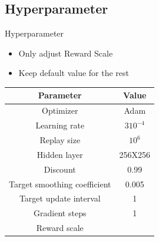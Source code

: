\subsection{Hyperparameter}
\begin{frame}{Hyperparameter}
\begin{itemize}
    \item Only adjust Reward Scale
    \item Keep default value for the rest
\end{itemize}
\centering
 \begin{tabular}{ c|c  }

   Parameter & Value \\ \hline 
   Optimizer & Adam \\
   Learning rate & \(3 10^{-4}\) \\ 
   Replay size & \(10^6\) \\ 
   Hidden layer&   256X256  \\
   Discount & 0.99 \\ 
   Target smoothing coefficient & 0.005 \\ 
   Target update interval & 1 \\ 
   Gradient steps & 1 \\
   Reward scale & \color{blue}{1000} \\
    \end{tabular}
\end{frame}
